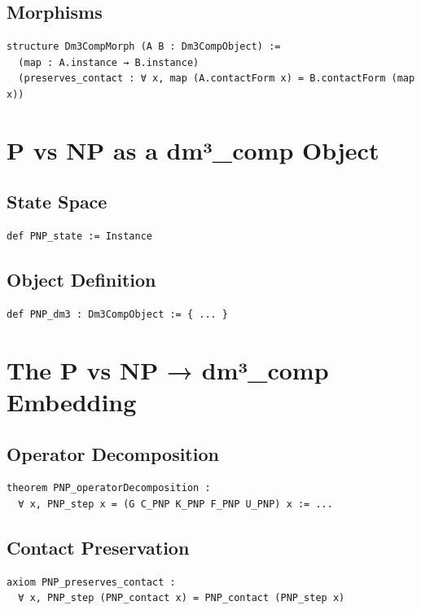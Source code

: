 \documentclass[11pt,a4paper]{article}
\begin{document}
\subsection{Morphisms}
\begin{lstlisting}
structure Dm3CompMorph (A B : Dm3CompObject) :=
  (map : A.instance → B.instance)
  (preserves_contact : ∀ x, map (A.contactForm x) = B.contactForm (map x))
\end{lstlisting}

\section{P vs NP as a dm³\_comp Object}

\subsection{State Space}
\begin{lstlisting}
def PNP_state := Instance
\end{lstlisting}

\subsection{Object Definition}
\begin{lstlisting}
def PNP_dm3 : Dm3CompObject := { ... }
\end{lstlisting}

\section{The P vs NP → dm³\_comp Embedding}

\subsection{Operator Decomposition}
\begin{lstlisting}
theorem PNP_operatorDecomposition :
  ∀ x, PNP_step x = (G C_PNP K_PNP F_PNP U_PNP) x := ...
\end{lstlisting}

\subsection{Contact Preservation}
\begin{lstlisting}
axiom PNP_preserves_contact :
  ∀ x, PNP_step (PNP_contact x) = PNP_contact (PNP_step x)
\end{lstlisting}
\end{document}
